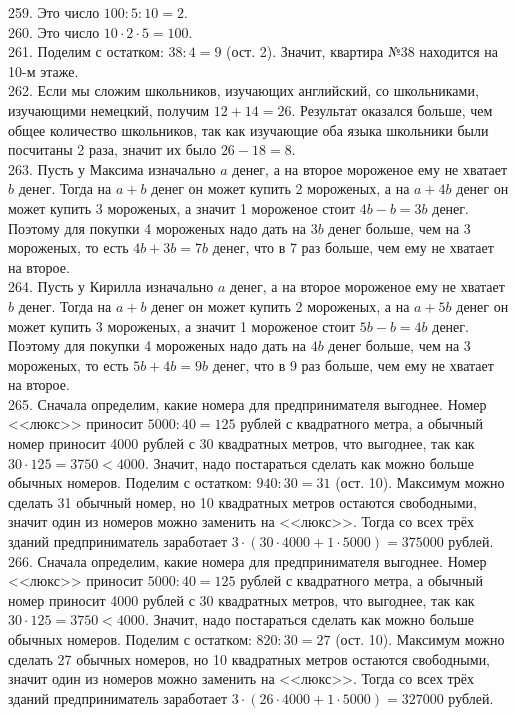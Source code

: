 \documentclass[12pt]{article}
\begin{document}
259. Это число $100:5:10=2.$\\
260. Это число $10\cdot2\cdot5=100.$\\
261. Поделим с остатком: $38:4=9$ (ост. 2). Значит, квартира №38 находится на 10-м этаже.\\
262. Если мы сложим школьников, изучающих английский, со школьниками, изучающими немецкий, получим $12+14=26.$ Результат оказался больше, чем общее количество школьников, так как изучающие оба языка школьники были посчитаны 2 раза, значит их было $26-18=8.$\\
263. Пусть у Максима изначально $a$ денег, а на второе мороженое ему не хватает $b$ денег. Тогда на $a+b$ денег он может купить 2 мороженых, а на $a+4b$ денег он может купить 3 мороженых, а значит 1 мороженое стоит $4b-b=3b$ денег. Поэтому для покупки 4 мороженых надо дать на $3b$ денег больше, чем на 3 мороженых, то есть $4b+3b=7b$ денег, что в 7 раз больше, чем ему не хватает на второе.\\
264. Пусть у Кирилла изначально $a$ денег, а на второе мороженое ему не хватает $b$ денег. Тогда на $a+b$ денег он может купить 2 мороженых, а на $a+5b$ денег он может купить 3 мороженых, а значит 1 мороженое стоит $5b-b=4b$ денег. Поэтому для покупки 4 мороженых надо дать на $4b$ денег больше, чем на 3 мороженых, то есть $5b+4b=9b$ денег, что в 9 раз больше, чем ему не хватает на второе.\\
265. Сначала определим, какие номера для предпринимателя выгоднее. Номер <<люкс>> приносит $5000:40=125$ рублей с квадратного метра, а обычный номер приносит 4000 рублей с 30 квадратных метров, что выгоднее, так как $30\cdot125=3750<4000.$ Значит, надо постараться сделать как можно больше обычных номеров. Поделим с остатком: $940:30=31$ (ост. 10). Максимум можно сделать 31 обычный номер, но 10 квадратных метров остаются свободными, значит один из номеров можно заменить на <<люкс>>. Тогда со всех трёх зданий предприниматель заработает $3\cdot(30\cdot4000+1\cdot5000)=375000$ рублей.\\
266. Сначала определим, какие номера для предпринимателя выгоднее. Номер <<люкс>> приносит $5000:40=125$ рублей с квадратного метра, а обычный номер приносит 4000 рублей с 30 квадратных метров, что выгоднее, так как $30\cdot125=3750<4000.$ Значит, надо постараться сделать как можно больше обычных номеров. Поделим с остатком: $820:30=27$ (ост. 10). Максимум можно сделать 27 обычных номеров, но 10 квадратных метров остаются свободными, значит один из номеров можно заменить на <<люкс>>. Тогда со всех трёх зданий предприниматель заработает $3\cdot(26\cdot4000+1\cdot5000)=327000$ рублей.\\
\end{document}

